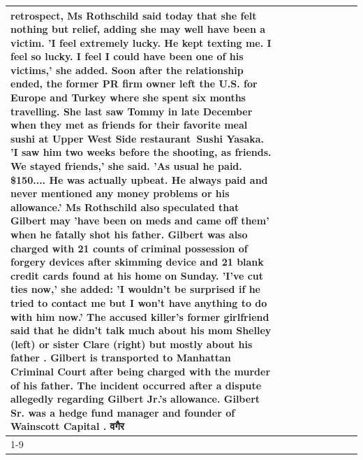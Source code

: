 \begin{table}[H]
\begin{tabular}{lllrlllll}
retrospect, Ms Rothschild said today that she felt nothing but relief, adding she may well have been a victim. 'I feel extremely lucky. He kept texting me. I feel so lucky. I feel I could have been one of his victims,' she added. Soon after the relationship ended, the former PR firm owner left the U.S. for Europe and Turkey where she spent six months  travelling. She last saw Tommy in late December when they met as friends for their favorite meal sushi at Upper West Side restaurant Sushi Yasaka. 'I saw him two weeks before the shooting, as friends. We stayed friends,' she said. 'As usual he paid. \$150.... He was actually upbeat. He always paid and never mentioned any money problems or his allowance.' Ms Rothschild also speculated that Gilbert may 'have been on meds and came off them' when he fatally shot his father. Gilbert was also charged with 21 counts of criminal possession of forgery devices after skimming device and 21 blank credit cards found at his home on Sunday. 'I've cut ties now,' she added: 'I wouldn’t be surprised if he tried to contact me but I won’t have anything to do with him now.' The accused killer's former girlfriend said that he didn't talk much about his mom Shelley (left) or sister Clare (right) but mostly about his father . Gilbert is transported to Manhattan Criminal Court  after being charged with the murder of his father. The incident occurred after a dispute allegedly regarding Gilbert Jr.'s allowance. Gilbert Sr. was a hedge fund manager and founder of Wainscott Capital . वगैर \\
\cline{1-9}

\end{tabular}
\end{table}
